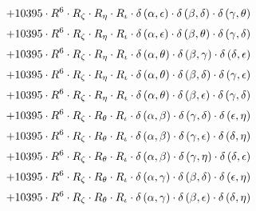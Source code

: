 \begin{subequations}
\begin{gather}
 \\[0.2em] \notag 		 + 10395 \cdot R^{6} \cdot R_{\zeta{}} \cdot R_{\eta{}} \cdot R_{\iota{}} \cdot \delta{}\left(\alpha{}, \epsilon{}\right) \cdot \delta{}\left(\beta{}, \delta{}\right) \cdot \delta{}\left(\gamma{}, \theta{}\right) 
 \\[0.2em] \notag 		 + 10395 \cdot R^{6} \cdot R_{\zeta{}} \cdot R_{\eta{}} \cdot R_{\iota{}} \cdot \delta{}\left(\alpha{}, \epsilon{}\right) \cdot \delta{}\left(\beta{}, \theta{}\right) \cdot \delta{}\left(\gamma{}, \delta{}\right) 
 \\[0.2em] \notag 		 + 10395 \cdot R^{6} \cdot R_{\zeta{}} \cdot R_{\eta{}} \cdot R_{\iota{}} \cdot \delta{}\left(\alpha{}, \theta{}\right) \cdot \delta{}\left(\beta{}, \gamma{}\right) \cdot \delta{}\left(\delta{}, \epsilon{}\right) 
 \\[0.2em] \notag 		 + 10395 \cdot R^{6} \cdot R_{\zeta{}} \cdot R_{\eta{}} \cdot R_{\iota{}} \cdot \delta{}\left(\alpha{}, \theta{}\right) \cdot \delta{}\left(\beta{}, \delta{}\right) \cdot \delta{}\left(\gamma{}, \epsilon{}\right) 
 \\[0.2em] \notag 		 + 10395 \cdot R^{6} \cdot R_{\zeta{}} \cdot R_{\eta{}} \cdot R_{\iota{}} \cdot \delta{}\left(\alpha{}, \theta{}\right) \cdot \delta{}\left(\beta{}, \epsilon{}\right) \cdot \delta{}\left(\gamma{}, \delta{}\right) 
 \\[0.2em] \notag 		 + 10395 \cdot R^{6} \cdot R_{\zeta{}} \cdot R_{\theta{}} \cdot R_{\iota{}} \cdot \delta{}\left(\alpha{}, \beta{}\right) \cdot \delta{}\left(\gamma{}, \delta{}\right) \cdot \delta{}\left(\epsilon{}, \eta{}\right) 
 \\[0.2em] \notag 		 + 10395 \cdot R^{6} \cdot R_{\zeta{}} \cdot R_{\theta{}} \cdot R_{\iota{}} \cdot \delta{}\left(\alpha{}, \beta{}\right) \cdot \delta{}\left(\gamma{}, \epsilon{}\right) \cdot \delta{}\left(\delta{}, \eta{}\right) 
 \\[0.2em] \notag 		 + 10395 \cdot R^{6} \cdot R_{\zeta{}} \cdot R_{\theta{}} \cdot R_{\iota{}} \cdot \delta{}\left(\alpha{}, \beta{}\right) \cdot \delta{}\left(\gamma{}, \eta{}\right) \cdot \delta{}\left(\delta{}, \epsilon{}\right) 
 \\[0.2em] \notag 		 + 10395 \cdot R^{6} \cdot R_{\zeta{}} \cdot R_{\theta{}} \cdot R_{\iota{}} \cdot \delta{}\left(\alpha{}, \gamma{}\right) \cdot \delta{}\left(\beta{}, \delta{}\right) \cdot \delta{}\left(\epsilon{}, \eta{}\right) 
 \\[0.2em] \notag 		 + 10395 \cdot R^{6} \cdot R_{\zeta{}} \cdot R_{\theta{}} \cdot R_{\iota{}} \cdot \delta{}\left(\alpha{}, \gamma{}\right) \cdot \delta{}\left(\beta{}, \epsilon{}\right) \cdot \delta{}\left(\delta{}, \eta{}\right) 

\end{gather}
\end{subequations}
